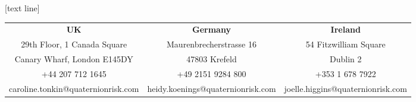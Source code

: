 \documentclass[10pt,German]{beamer}
\begin{document}
[text line]{}

\begin{frame}{}

{\tiny
\color{white}
\begin{center}
\hspace{-0.49cm}
\begin{tabular}{ccc}
{\bf UK}                           & {\bf Germany}           &  {\bf Ireland} \\
29th Floor, 1 Canada Square        & Maurenbrecherstrasse 16 & 54 Fitzwilliam Square\\
Canary Wharf, London E145DY        & 47803 Krefeld           & Dublin 2\\
+44 207 712 1645                   & +49 2151 9284 800       & +353 1 678 7922\\
caroline.tonkin@quaternionrisk.com & heidy.koenings@quaternionrisk.com & joelle.higgins@quaternionrisk.com\\
\end{tabular}
\end{center}
}

\end{frame}
\end{document}
